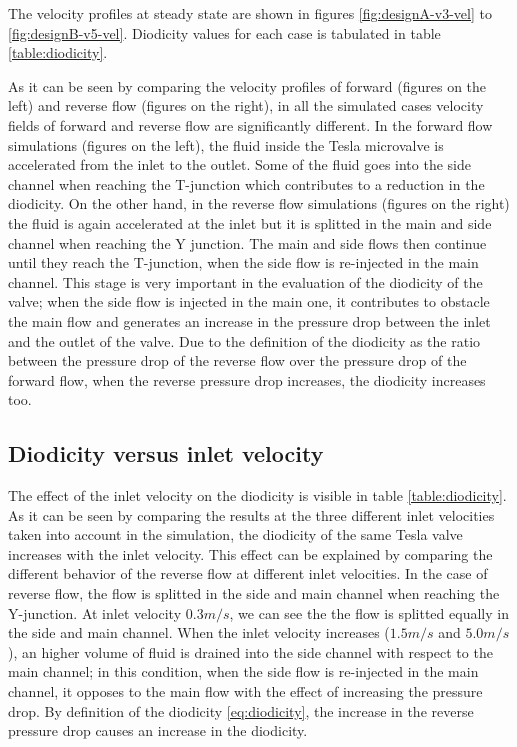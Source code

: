 \documentclass[12pt, letterpaper]{article}
\begin{document}
The velocity profiles at steady state are shown in figures \ref{fig:designA-v3-vel} to \ref{fig:designB-v5-vel}. Diodicity values for each case is tabulated in table \ref{table:diodicity}.


As it can be seen by comparing the velocity profiles of forward (figures on the left) and reverse flow (figures on the right), in all the simulated cases velocity fields of forward and reverse flow are significantly different.
\newline
In the forward flow simulations (figures on the left), the fluid inside the Tesla microvalve is accelerated from the inlet to the outlet. Some of the fluid goes into the side channel when reaching the T-junction which contributes to a reduction in the diodicity.
\newline
On the other hand, in the reverse flow simulations (figures on the right) the fluid is again accelerated at the inlet but it is splitted in the main and side channel when reaching the Y junction. The main and side flows then continue until they reach the T-junction, when the side flow is re-injected in the main channel. This stage is very important in the evaluation of the diodicity of the valve; when the side flow is injected in the main one, it contributes to obstacle the main flow and generates an increase in the pressure drop between the inlet and the outlet of the valve.
Due to the definition of the diodicity as the ratio between the pressure drop of the reverse flow over the pressure drop of the forward flow, when the reverse pressure drop increases, the diodicity increases too.

\subsection{Diodicity versus inlet velocity}
The effect of the inlet velocity on the diodicity is visible in table \ref{table:diodicity}. As it can be seen by comparing the results at the three different inlet velocities taken into account in the simulation, the diodicity of the same Tesla valve increases with the inlet velocity.
\newline
This effect can be explained by comparing the different behavior of the reverse flow at different inlet velocities.
In the case of reverse flow, the flow is splitted in the side and main channel when reaching the Y-junction. 
At inlet velocity $0.3 m/s$, we can see the the flow is splitted equally in the side and main channel.
When the inlet velocity increases ($1.5 m/s$ and $5.0 m/s$), an higher volume of fluid is drained into the side channel with respect to the main channel; in this condition, when the side flow is re-injected in the main channel, it opposes to the main flow with the effect of increasing the pressure drop. By definition of the diodicity \ref{eq:diodicity}, the increase in the reverse pressure drop causes an increase in the diodicity.
\end{document}
